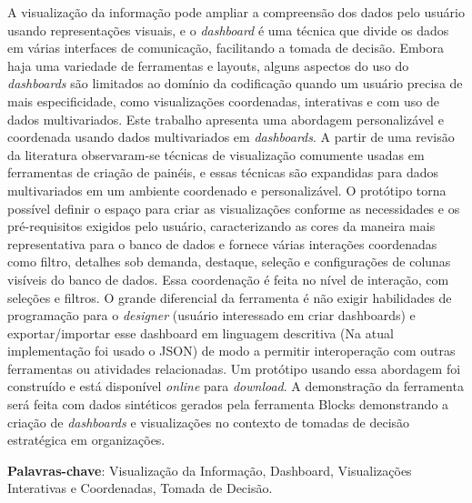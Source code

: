 \documentclass[
	12pt,				%
	openright,			%
	oneside,			%
	a4paper,			%
	english,			%
	brazil				%
	]{abntex2}
\begin{document}

\setlength{\absparsep}{18pt} %
\begin{resumo}
A visualização da informação pode ampliar a compreensão dos dados pelo usuário usando representações visuais, e o \textit{dashboard} é uma técnica que divide os dados em várias interfaces de comunicação, facilitando a tomada de decisão. Embora haja uma variedade de ferramentas e layouts, alguns aspectos do uso do \textit{dashboards} são limitados ao domínio da codificação quando um usuário precisa de mais especificidade, como visualizações coordenadas, interativas e com uso de dados multivariados. Este trabalho apresenta uma abordagem personalizável e coordenada usando dados multivariados em \textit{dashboards}. A partir de uma revisão da literatura observaram-se técnicas de visualização comumente usadas em ferramentas de criação de painéis, e essas técnicas são expandidas para dados multivariados em um ambiente coordenado e personalizável. O protótipo torna possível definir o espaço para criar as visualizações conforme as necessidades e os pré-requisitos exigidos pelo usuário, caracterizando as cores da maneira mais representativa para o banco de dados e fornece várias interações coordenadas como filtro, detalhes sob demanda, destaque, seleção e configurações de colunas visíveis do banco de dados. Essa coordenação é feita no nível de interação, com seleções e filtros. O grande diferencial da ferramenta é não exigir habilidades de programação para o \textit{designer} (usuário interessado em criar dashboards) e exportar/importar esse dashboard em linguagem descritiva (Na atual implementação foi usado o JSON) de modo a permitir interoperação com outras ferramentas ou atividades relacionadas. Um protótipo usando essa abordagem foi construído e está disponível \textit{online} para \textit{download}. A demonstração da ferramenta será feita com dados sintéticos gerados pela ferramenta  Blocks demonstrando a criação de \textit{dashboards} e visualizações no contexto de tomadas de decisão estratégica em organizações. 

 \textbf{Palavras-chave}: Visualização da Informação, Dashboard, Visualizações Interativas e Coordenadas, Tomada de Decisão.
\end{resumo}
\end{document}
